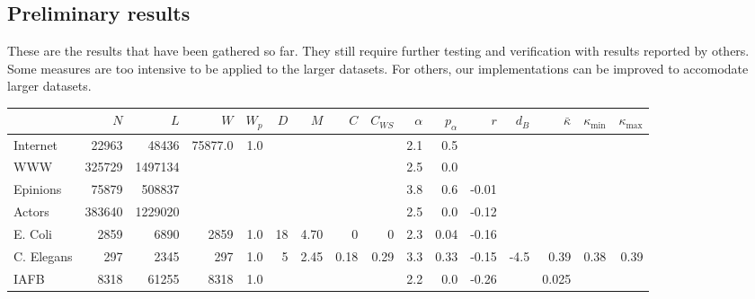 \documentclass{article}
\theoremstyle{definition}
\begin{document}
\begin{landscape}

\section*{Preliminary results}

These are the results that have been gathered so far. They still require further testing and verification with results reported by others. Some measures are too intensive to be applied to the larger datasets. For others, our implementations can be improved to accomodate larger datasets.

\begin{tabular}{l | r r r r r r r r r r r r r r r }
  \hline
    & $N$ & $L$ & $W$ & $W_p$ & $D$ & $M$ & $C$ & $C_{WS}$ & $\alpha$ & $p_\alpha$ & $r$ & $d_B$ & $\bar{\kappa}$ & $\kappa_{\mbox{min}}$ & $\kappa_{\mbox{max}}$  \\
    \hline
 Internet & 22963 & 48436 & 75877.0 & 1.0 & & & & & 2.1 & 0.5 & & & & & \\   
 WWW & 325729 & 1497134 & & & & & & & \color{gray} 2.5 & 0.0 & & & & & \\
 Epinions & 75879 & 508837 & & & & & & & 3.8 & 0.6 & -0.01 & & & & \\ 
 Actors  & 383640 & 1229020 & & & & & & & \color{gray}2.5 & 0.0 & -0.12 & & & & \\
 E. Coli  & 2859 & 6890 & 2859 & 1.0 & 18 & 4.70 & 0 & 0 & \color{gray} 2.3 & 0.04 & -0.16 & & & & \\
 C. Elegans  & 297 & 2345 & 297 & 1.0 & 5 & 2.45 & 0.18 & 0.29 & 3.3 & 0.33 & -0.15 & -4.5 & 0.39 & 0.38 & 0.39 \\
 IAFB  & 8318 & 61255 & 8318 & 1.0 & & & & & \color{gray} 2.2 & 0.0 & -0.26 & & 0.025 & &  \\ 
 \hline

\end{tabular}

\end{landscape}



\end{document}
